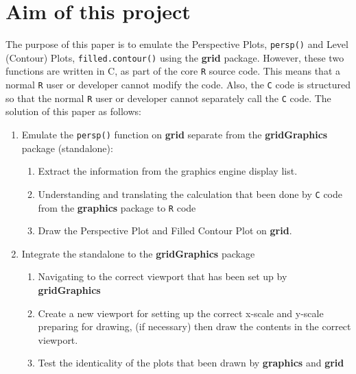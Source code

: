 \documentclass[11pt,twoside]{report}
\begin{document}
\newpage
\section{Aim of this project}
The purpose of this paper is to emulate the Perspective Plots, \texttt{persp()} and Level (Contour) Plots, \texttt{filled.contour()} using the \textbf{grid} package. However, these two functions are written in C, as part of the core \texttt{R} source code. This means that a normal \texttt{R} user or developer cannot modify the code. Also, the \texttt{C} code is structured so that the normal \texttt{R} user or developer cannot separately call the \texttt{C} code. The solution of this paper as follows: 

\begin{enumerate}
	\item Emulate the \texttt{persp()} function on \textbf{grid} separate from the \textbf{gridGraphics} package (standalone):
	\begin{enumerate}
		\item Extract the information from the graphics engine display list.
		\item Understanding and translating the calculation that been done by \texttt{C} code from the \textbf{graphics} package to \texttt{R} code
		\item Draw the Perspective Plot and Filled Contour Plot on \textbf{grid}.
	\end{enumerate}
	\item Integrate the standalone to the \textbf{gridGraphics} package
		\begin{enumerate}
			\item Navigating to the correct viewport that has been set up by \textbf{gridGraphics}
			\item Create a new viewport for setting up the correct x-scale and y-scale preparing for drawing, (if necessary) then draw the contents in the correct viewport.
			\item Test the identicality of the plots that been drawn by \textbf{graphics} and \textbf{grid}
		\end{enumerate}
\end{enumerate}



\end{document}
